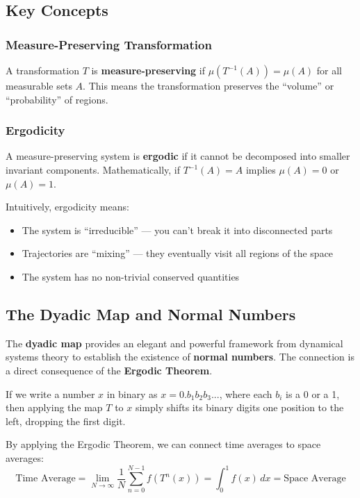 \documentclass[12pt,a4paper]{article}
\begin{document}
\subsection{Key Concepts}

\subsubsection{Measure-Preserving Transformation}
A transformation $T$ is \textbf{measure-preserving} if $\mu(T^{-1}(A)) = \mu(A)$ for all measurable sets $A$. This means the transformation preserves the ``volume'' or ``probability'' of regions.

\subsubsection{Ergodicity}
A measure-preserving system is \textbf{ergodic} if it cannot be decomposed into smaller invariant components. Mathematically, if $T^{-1}(A) = A$ implies $\mu(A) = 0$ or $\mu(A) = 1$.

Intuitively, ergodicity means:
\begin{itemize}
    \item The system is ``irreducible'' --- you can't break it into disconnected parts
    \item Trajectories are ``mixing'' --- they eventually visit all regions of the space
    \item The system has no non-trivial conserved quantities
\end{itemize}

\subsection{The Dyadic Map and Normal Numbers}

The \textbf{dyadic map} provides an elegant and powerful framework from dynamical systems theory to establish the existence of \textbf{normal numbers}. The connection is a direct consequence of the \textbf{Ergodic Theorem}.

If we write a number $x$ in binary as $x = 0.b_1b_2b_3...$, where each $b_i$ is a 0 or a 1, then applying the map $T$ to $x$ simply shifts its binary digits one position to the left, dropping the first digit.

By applying the Ergodic Theorem, we can connect time averages to space averages:
\[
\text{Time Average} = \lim_{N \to \infty} \frac{1}{N} \sum_{n=0}^{N-1} f(T^n(x)) = \int_0^1 f(x) \,dx = \text{Space Average}
\]
\end{document}
